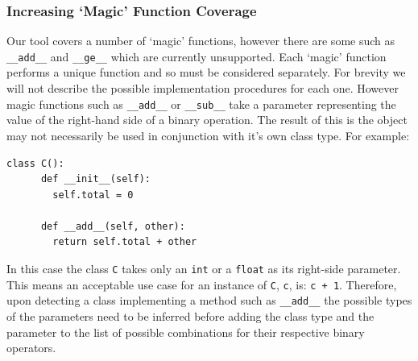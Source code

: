 \documentclass[12pt, titlepage]{article}
\begin{document}
\subsubsection*{Increasing `Magic' Function Coverage}
Our tool covers a number of `magic' functions, however there are some such as \texttt{\_\_add\_\_} and \texttt{\_\_ge\_\_} which are currently unsupported. Each `magic' function performs a unique function and so must be considered separately. For brevity we will not describe the possible implementation procedures for each one. However magic functions such as \texttt{\_\_add\_\_} or \texttt{\_\_sub\_\_} take a parameter representing the value of the right-hand side of a binary operation. The result of this is the object may not necessarily be used in conjunction with it's own class type. For example:
\begin{lstlisting}[mathescape]
    class C():
      def __init__(self):
        self.total = 0
        
      def __add__(self, other):
        return self.total + other
\end{lstlisting}
In this case the class \texttt{C} takes only an \texttt{int} or a \texttt{float} as its right-side parameter. This means an acceptable use case for an instance of \texttt{C}, \texttt{c}, is: \texttt{c + 1}. Therefore, upon detecting a class implementing a method such as \texttt{\_\_add\_\_} the possible types of the parameters need to be inferred before adding the class type and the parameter to the list of possible combinations for their respective binary operators.
\end{document}
